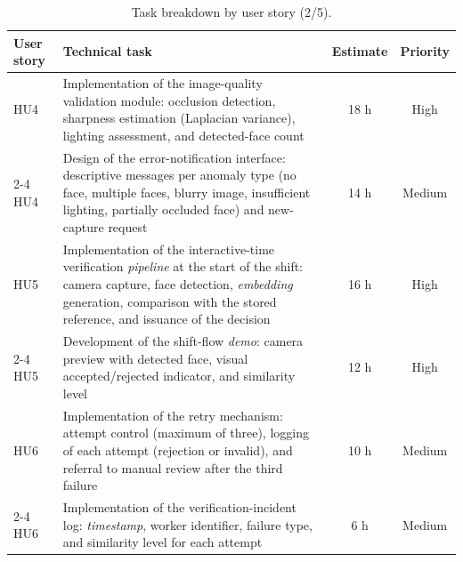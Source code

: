 \documentclass[
  11pt, %
]{charter}
\begin{document}
\begin{table}[htpb]
  \centering
  \caption{Task breakdown by user story (2/5).}
  \begin{tabularx}{\linewidth}{@{}|X|X|c|c|@{}}
    \hline
    \rowcolor[HTML]{C0C0C0}
    User story & Technical task & Estimate & Priority \\ \hline

    HU4 & Implementation of the image-quality validation module: occlusion detection, sharpness estimation (Laplacian variance), lighting assessment, and detected-face count & 18 h & High \\ \cline{2-4}
    HU4 & Design of the error-notification interface: descriptive messages per anomaly type (no face, multiple faces, blurry image, insufficient lighting, partially occluded face) and new-capture request & 14 h & Medium \\ \hline

    HU5 & Implementation of the interactive-time verification \textit{pipeline} at the start of the shift: camera capture, face detection, \textit{embedding} generation, comparison with the stored reference, and issuance of the decision & 16 h & High \\ \cline{2-4}
    HU5 & Development of the shift-flow \textit{demo}: camera preview with detected face, visual accepted/rejected indicator, and similarity level & 12 h & High \\ \hline

    HU6 & Implementation of the retry mechanism: attempt control (maximum of three), logging of each attempt (rejection or invalid), and referral to manual review after the third failure & 10 h & Medium \\ \cline{2-4}
    HU6 & Implementation of the verification-incident log: \textit{timestamp}, worker identifier, failure type, and similarity level for each attempt & 6 h & Medium \\ \hline

  \end{tabularx}
\end{table}
\end{document}
